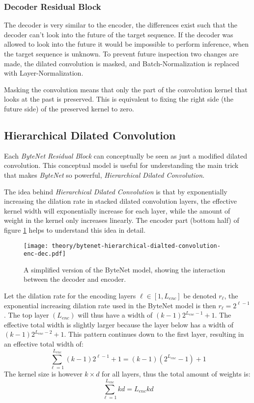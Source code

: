\subsubsection{Decoder Residual Block}

The decoder is very similar to the encoder, the differences exist such that the decoder can't look into the future of the target sequence. If the decoder was allowed to look into the future it would be impossible to perform inference, when the target sequence is unknown. To prevent future inspection two changes are made‚ the dilated convolution is masked, and Batch-Normalization is replaced with Layer-Normalization.

Masking the convolution means that only the part of the convolution kernel that looks at the past is preserved. This is equivalent to fixing the right side (the future side) of the preserved kernel to zero.

\subsection{Hierarchical Dilated Convolution}
\label{sec:theory:bytenet:hierarchical-dilated-convolution}

Each \textit{ByteNet Residual Block} can conceptually be seen as just a modified dilated convolution. This conceptual model is useful for understanding the main trick that makes \textit{ByteNet} so powerful, \textit{Hierarchical Dilated Convolution}.

The idea behind \textit{Hierarchical Dilated Convolution} is that by exponentially increasing the dilation rate in stacked dilated convolution layers, the effective kernel width will exponentially increase for each layer, while the amount of weight in the kernel only increases linearly. The encoder part (bottom half) of figure \ref{fig:bytenet:simplified-hdc} helps to understand this idea in detail.

\begin{figure}[h]
    \centering
    \texttt{[image: theory/bytenet-hierarchical-dialted-convolution-enc-dec.pdf]}
    \caption{A simplified version of the ByteNet model, showing the interaction between the decoder and encoder.}
    \label{fig:bytenet:simplified-hdc}
\end{figure}

Let the dilation rate for the encoding layers $\ell \in [1, L_{enc}]$ be denoted $r_\ell$, the exponential increasing dilation rate used in the ByteNet model is then $r_\ell = 2^{\ell - 1}$. The top layer $(L_{enc})$ will thus have a width of $(k-1) 2^{L_{enc} -1} + 1$. The effective total width is slightly larger because the layer below has a width of $(k-1) 2^{L_{enc} - 2} + 1$. This pattern continues down to the first layer, resulting in an effective total width of:
\begin{equation}
\sum_{\ell = 1}^{L_{enc}} (k - 1) 2^{\ell-1} + 1 = (k - 1) (2^{L_{enc}} - 1) + 1
\end{equation}
The kernel size is however $k \times d$ for all layers, thus the total amount of weights is:
\begin{equation}
\sum_{\ell = 1}^{L_{enc}} k d = L_{enc} k d
\end{equation}

